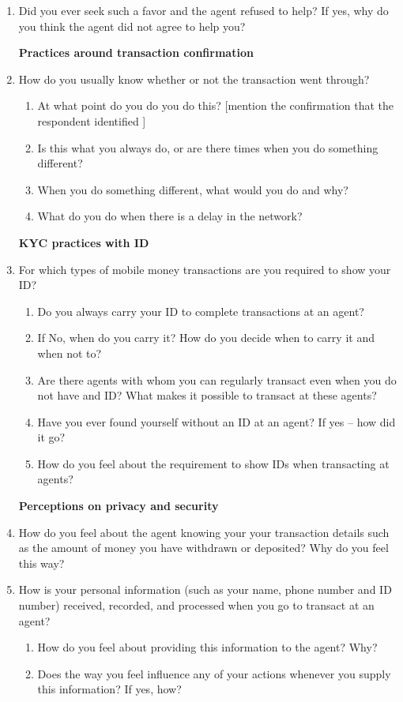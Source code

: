\begin{appendices}
\begin{enumerate}
    \item Did you ever seek such a favor and the agent refused to help? If yes, why do you think the agent did not agree to help you?
    
    \textbf{Practices around transaction confirmation}
    \item How do you usually know whether or not the transaction went through?
    \begin{enumerate}
        \item At what point do you do you do this? [mention the confirmation that the respondent identified ]
        \item Is this what you always do, or are there times when you do something different? 
        \item When you do something different, what would you do and why?
        \item What do you do when there is a delay in the network?
    \end{enumerate}

    \textbf{KYC practices with ID}
    \item For which types of mobile money transactions are you required to show your ID?
    \begin{enumerate}
        \item Do you always carry your ID to complete transactions at an agent? 
        \item If No, when do you carry it? How do you decide when to carry it and when  not to? 
        \item Are there agents with whom you can regularly transact even when you do not have and ID? What makes it possible to transact at these agents?
        \item Have you ever found yourself without an ID at an agent? If yes – how did it go?
        \item How do you feel about the requirement to show IDs when transacting at agents?
    \end{enumerate}
    
    \textbf{Perceptions on privacy and security}
    \item How do you feel about the agent knowing your your transaction details such as the amount of money you have withdrawn or deposited? Why do you feel this way?

    \item How is your personal information (such as your name, phone number and ID number) received, recorded, and processed when you go to transact at an agent?
    \begin{enumerate}
        \item How do you feel about providing this information to the agent? Why?
        \item Does the way you feel influence any of your actions whenever you supply this information? If yes, how?
    \end{enumerate}


\end{enumerate}
\end{appendices}
